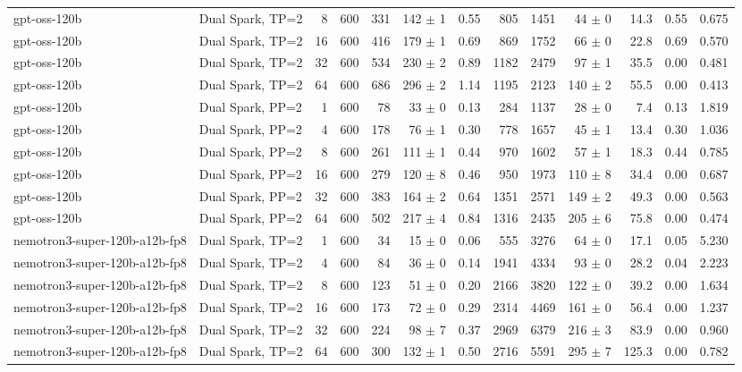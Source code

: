 \begin{tabular}{l l r r r r r r r r r r r}
gpt-oss-120b & Dual Spark, TP=2 & 8 & 600 & 331 & 142 $\pm$ 1 & 0.55 & 805 & 1451 & 44 $\pm$ 0 & 14.3 & 0.55 & 0.675 \\
gpt-oss-120b & Dual Spark, TP=2 & 16 & 600 & 416 & 179 $\pm$ 1 & 0.69 & 869 & 1752 & 66 $\pm$ 0 & 22.8 & 0.69 & 0.570 \\
gpt-oss-120b & Dual Spark, TP=2 & 32 & 600 & 534 & 230 $\pm$ 2 & 0.89 & 1182 & 2479 & 97 $\pm$ 1 & 35.5 & 0.00 & 0.481 \\
gpt-oss-120b & Dual Spark, TP=2 & 64 & 600 & 686 & 296 $\pm$ 2 & 1.14 & 1195 & 2123 & 140 $\pm$ 2 & 55.5 & 0.00 & 0.413 \\
\addlinespace
gpt-oss-120b & Dual Spark, PP=2 & 1 & 600 & 78\rlap{$^\dagger$} & 33 $\pm$ 0 & 0.13 & 284 & 1137 & 28 $\pm$ 0 & 7.4 & 0.13 & 1.819 \\
gpt-oss-120b & Dual Spark, PP=2 & 4 & 600 & 178 & 76 $\pm$ 1 & 0.30 & 778 & 1657 & 45 $\pm$ 1 & 13.4 & 0.30 & 1.036 \\
gpt-oss-120b & Dual Spark, PP=2 & 8 & 600 & 261 & 111 $\pm$ 1 & 0.44 & 970 & 1602 & 57 $\pm$ 1 & 18.3 & 0.44 & 0.785 \\
gpt-oss-120b & Dual Spark, PP=2 & 16 & 600 & 279 & 120 $\pm$ 8 & 0.46 & 950 & 1973 & 110 $\pm$ 8 & 34.4 & 0.00 & 0.687 \\
gpt-oss-120b & Dual Spark, PP=2 & 32 & 600 & 383 & 164 $\pm$ 2 & 0.64 & 1351 & 2571 & 149 $\pm$ 2 & 49.3 & 0.00 & 0.563 \\
gpt-oss-120b & Dual Spark, PP=2 & 64 & 600 & 502 & 217 $\pm$ 4 & 0.84 & 1316 & 2435 & 205 $\pm$ 6 & 75.8 & 0.00 & 0.474 \\
\addlinespace
nemotron3-super-120b-a12b-fp8 & Dual Spark, TP=2 & 1 & 600 & 34\rlap{$^\dagger$} & 15 $\pm$ 0 & 0.06 & 555 & 3276 & 64 $\pm$ 0 & 17.1 & 0.05 & 5.230 \\
nemotron3-super-120b-a12b-fp8 & Dual Spark, TP=2 & 4 & 600 & 84\rlap{$^\dagger$} & 36 $\pm$ 0 & 0.14 & 1941 & 4334 & 93 $\pm$ 0 & 28.2 & 0.04 & 2.223 \\
nemotron3-super-120b-a12b-fp8 & Dual Spark, TP=2 & 8 & 600 & 123 & 51 $\pm$ 0 & 0.20 & 2166 & 3820 & 122 $\pm$ 0 & 39.2 & 0.00 & 1.634 \\
nemotron3-super-120b-a12b-fp8 & Dual Spark, TP=2 & 16 & 600 & 173 & 72 $\pm$ 0 & 0.29 & 2314 & 4469 & 161 $\pm$ 0 & 56.4 & 0.00 & 1.237 \\
nemotron3-super-120b-a12b-fp8 & Dual Spark, TP=2 & 32 & 600 & 224 & 98 $\pm$ 7 & 0.37 & 2969 & 6379 & 216 $\pm$ 3 & 83.9 & 0.00 & 0.960 \\
nemotron3-super-120b-a12b-fp8 & Dual Spark, TP=2 & 64 & 600 & 300 & 132 $\pm$ 1 & 0.50 & 2716 & 5591 & 295 $\pm$ 7 & 125.3 & 0.00 & 0.782 \\

\end{tabular}
